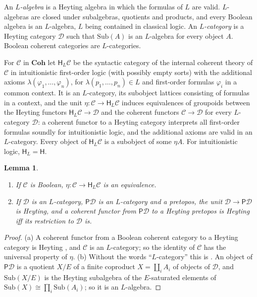 \documentclass[11pt]{amsart}
\newtheorem{lem}[thm]{Lemma}
\theoremstyle{definition}
\newcommand{\Coh}{\mathbf{Coh}}
\newcommand{\Sub}{\mathrm{Sub}}
\newcommand{\PP}{\mathsf P}
\newcommand{\HH}{\mathsf H}
\newcommand{\cC}{\mathcal C}
\newcommand{\cD}{\mathcal D}
\begin{document}
An \emph{$L$-algebra} is a Heyting algebra in which the formulas of $L$
are valid. $L$-algebras are closed under subalgebras, quotients and
products, and every Boolean algebra is an $L$-algebra, $L$ being
contained in classical logic. An \emph{$L$-category} is a Heyting
category $\cD$ such that $\Sub(A)$ is an $L$-algebra for every object
$A$. Boolean coherent categories are $L$-categories.

For $\cC$ in $\Coh$ let $\HH_L\cC$ be the syntactic category of the
internal coherent theory of $\cC$ in intuitionistic first-order logic
(with possibly empty sorts) with the additional axioms
$\lambda(\varphi_1,\dots,\varphi_n)$, for $\lambda(p_1,\dots,p_n)\in L$
and first-order formulas $\varphi_i$ in a common context. It is an
$L$-category, its subobject lattices consisting of formulas in a
context, and the unit $\eta\colon\cC\to\HH_L\cC$ induces equivalences of
groupoids between the Heyting functors $\HH_L\cC\to\cD$ and the coherent
functors $\cC\to\cD$ for every $L$-category $\cD$: a coherent functor
to a Heyting category interprets all first-order formulas soundly for
intuitionistic logic, and the additional axioms are valid in an
$L$-category. Every object of $\HH_L\cC$ is a subobject of some $\eta
A$. For intuitionistic logic, $\HH_L=\HH$.

\begin{lem}\label{lem:basic}
\begin{enumerate}
\item[(a)] If $\cC$ is Boolean, $\eta\colon\cC\to\HH_L\cC$ is an
equivalence.
\item[(b)] If $\cD$ is an $L$-category, $\PP\cD$ is an $L$-category
and a pretopos, the unit $\cD\to\PP\cD$ is Heyting, and a coherent
functor from $\PP\cD$ to a Heyting pretopos is Heyting iff its
restriction to $\cD$ is.
\end{enumerate}
\end{lem}
\begin{proof}
(a) A coherent functor from a Boolean coherent category to a Heyting
category is Heyting \cite[Lemma~2.1]{Heyting}, and $\cC$ is an
$L$-category; so the identity of $\cC$ has the universal property of
$\eta$. (b) Without the words ``$L$-category'' this is
\cite[Lemma~2.2]{Heyting}. An object of $\PP\cD$ is a quotient $X/E$
of a finite coproduct $X=\coprod_iA_i$ of objects of $\cD$, and
$\Sub(X/E)$ is the Heyting subalgebra of the $E$-saturated elements of
$\Sub(X)\cong\prod_i\Sub(A_i)$; so it is an $L$-algebra.
\end{proof}
\end{document}
